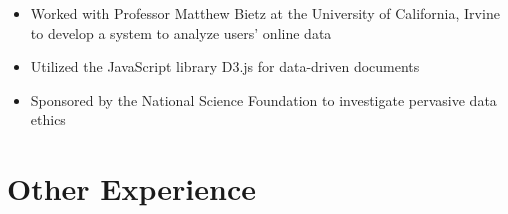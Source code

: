 \documentclass[10pt]{article}
\begin{document}
\begin{multicols}{2}
\begin{itemize}
	\setlength\itemsep{0em}
	\item Worked with Professor Matthew Bietz at the University of California, Irvine to develop a system to analyze users' online data
	\item Utilized the JavaScript library D3.js for data-driven documents
	\item Sponsored by the National Science Foundation to investigate pervasive data ethics
\end{itemize}
\end{multicols}

\vfill	

\section{Other Experience}
\end{document}
